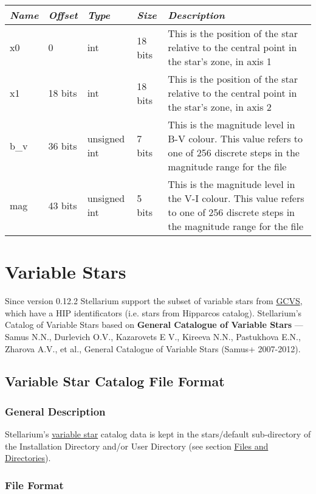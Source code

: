 \begin{longtabu} to \textwidth {l l l l X}
\toprule
\emph{Name} & \emph{Offset} & \emph{Type} & \emph{Size} &
\emph{Description}\tabularnewline
\midrule
x0 & 0 & int & 18 bits & This is the position of the star relative to
the central point in the star's zone, in axis 1\tabularnewline
\midrule
x1 & 18 bits & int & 18 bits & This is the position of the star relative
to the central point in the star's zone, in axis 2\tabularnewline
\midrule
b\_v & 36 bits & unsigned int & 7 bits & This is the magnitude level in
B-V colour. This value refers to one of 256 discrete steps in the
magnitude range for the file\tabularnewline
\midrule
mag & 43 bits & unsigned int & 5 bits & This is the magnitude level in
the V-I colour. This value refers to one of 256 discrete steps in the
magnitude range for the file\tabularnewline
\bottomrule
\end{longtabu}


\section{Variable Stars}
Since version 0.12.2 Stellarium support the subset of variable stars
from \href{http://www.sai.msu.su/gcvs/gcvs/}{GCVS}, which have a HIP
identificators (i.e. stars from Hipparcos catalog). Stellarium's Catalog
of Variable Stars based on \textbf{General Catalogue of Variable Stars} --- Samus N.N., Durlevich O.V., Kazarovets E V., Kireeva N.N., Pastukhova E.N., Zharova A.V., et al., General Catalogue of Variable Stars (Samus+ 2007-2012).

\subsection{Variable Star Catalog File
Format}\label{variable-star-catalog-file-format}

\subsubsection{General Description}\label{general-description}

Stellarium's \href{Variable_Stars}{variable star} catalog data is kept
in the stars/default sub-directory of the Installation Directory and/or
User Directory (see section
\href{Advanced_Use\#Files_and_Directories}{Files and Directories}).

\subsubsection{File Format}\label{file-format}

